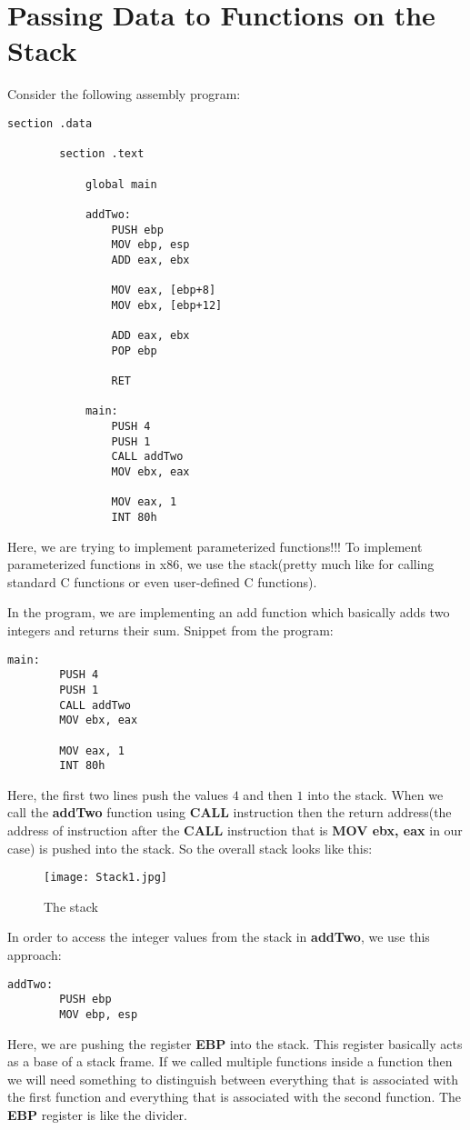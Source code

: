 \documentclass{article}
\makeatletter
\renewcommand\paragraph{\@startsection{paragraph}{4}{\z@}{-3.25ex \@plus -1ex \@minus -.2ex}{1.5ex \@plus .2ex}{\normalfont\normalsize\bfseries}}
\makeatother
\begin{document}
	\section{Passing Data to Functions on the Stack}\label{sec:sec1}
	\paragraph{}
	Consider the following assembly program:
	
	\begin{lstlisting}[frame=single, breaklines=true]
		section .data
		
		section .text
		
			global main
			
			addTwo:
				PUSH ebp
				MOV ebp, esp
				ADD eax, ebx
				
				MOV eax, [ebp+8]
				MOV ebx, [ebp+12]
				
				ADD eax, ebx
				POP ebp
				
				RET
			
			main:
				PUSH 4
				PUSH 1
				CALL addTwo
				MOV ebx, eax
				
				MOV eax, 1
				INT 80h
	\end{lstlisting}

Here, we are trying to implement parameterized functions!!! To implement parameterized functions in x86, we use the stack(pretty much like for calling standard C functions or even user-defined C functions).

In the program, we are implementing an add function which basically adds two integers and returns their sum.
\newpage
Snippet from the program:
\begin{lstlisting}[frame=single, breaklines=true]
	main:
		PUSH 4
		PUSH 1
		CALL addTwo
		MOV ebx, eax
		
		MOV eax, 1
		INT 80h
\end{lstlisting}
Here, the first two lines push the values $4$ and then $1$ into the stack. When we call the \textbf{addTwo} function using \textbf{CALL} instruction then the return address(the address of instruction after the \textbf{CALL} instruction that is \textbf{MOV ebx, eax} in our case) is pushed into the stack. So the overall stack looks like this:
\begin{figure}[h]
	\centering
	\texttt{[image: Stack1.jpg]}
	\caption{The stack}
	\label{fig:fig1}
\end{figure}

In order to access the integer values from the stack in \textbf{addTwo}, we use this approach:
\begin{lstlisting}[frame=single, breaklines=true]
	addTwo:
		PUSH ebp
		MOV ebp, esp
\end{lstlisting}
Here, we are pushing the register \textbf{EBP} into the stack. This register basically acts as a base of a stack frame. If we called multiple functions inside a function then we will need something to distinguish between everything that is associated with the first function and everything that is associated with the second function. The \textbf{EBP} register is like the divider.
\end{document}
